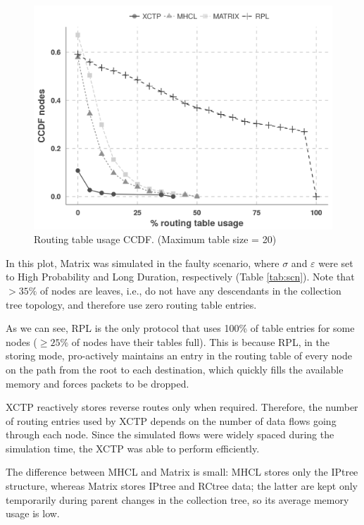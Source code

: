 \begin{figure}[t]
    \centering
    \includegraphics[width=1\linewidth]{Images/new-ccdf-t-usage}
    \caption{Routing table usage CCDF. (Maximum table size = 20)}
    \label{fig:table-usage}
\end{figure}

In this plot, Matrix was simulated in the faulty scenario, where $\sigma$ and $\varepsilon$ were set to High Probability and Long Duration, respectively (Table \ref{tab:scn}). Note that $>35\%$ of nodes are leaves, i.e., do not have any descendants in the collection tree topology, and therefore use zero routing table entries.

As we can see, RPL is the only protocol that uses 100\% of table entries for some nodes ($\geq25\%$ of nodes have their tables full). This is because RPL, in the storing mode, pro-actively maintains an entry in the routing table of every node on the path from the root to each destination, which quickly fills the available memory and forces packets to be dropped.

XCTP reactively stores reverse routes only when required. Therefore, the number of routing entries used by XCTP depends on the number of data flows going through each node. Since the simulated flows were widely spaced during the simulation time, the XCTP was able to perform efficiently.

The difference between MHCL and Matrix is small: MHCL stores only the IPtree structure, whereas Matrix stores IPtree and RCtree data; the latter are kept only temporarily during parent changes in the collection tree, so its average memory usage is low.

